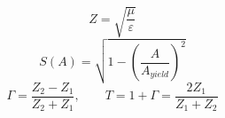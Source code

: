 %
\begin{equation}
    Z = \sqrt{\frac{\mu}{\varepsilon}}
    \label{eq:universal_impedance}
\end{equation}
%
\begin{equation}
    S(A) = \sqrt{1 - \left(\frac{A}{A_{yield}}\right)^{\!2}}
    \label{eq:universal_saturation}
\end{equation}
%
\begin{equation}
    \Gamma = \frac{Z_2 - Z_1}{Z_2 + Z_1}, \qquad
    T = 1 + \Gamma = \frac{2Z_1}{Z_1 + Z_2}
    \label{eq:universal_reflection}
\end{equation}
%
